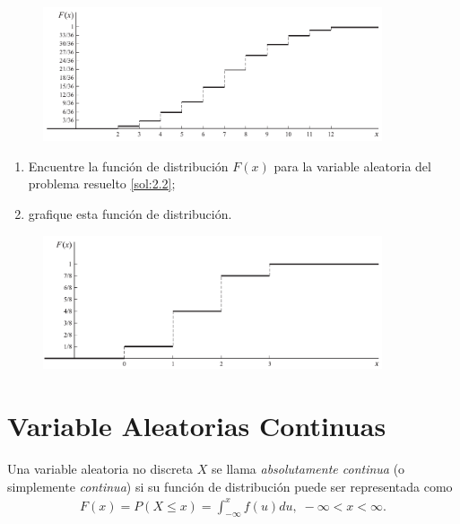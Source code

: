 \begin{figure}
 \centering
 \includegraphics[width=10cm,keepaspectratio=true]{./pe/pands0206.png}
\end{figure}




 \begin{ejemplo}
  \label{sol:2.4}
  \begin{enumerate}
   \item Encuentre la función de distribución $F(x)$ para la variable aleatoria del problema resuelto \ref{sol:2.2};
   \item grafique esta función de distribución.
  \end{enumerate}

 \end{ejemplo}



 \begin{figure}
 \centering
 \includegraphics[width=10cm,keepaspectratio=true]{./pe/pands0207.png}
\end{figure}


\chapter{Variable Aleatorias Continuas}

	Una variable aleatoria no discreta $X$ se llama \emph{absolutamente continua} (o simplemente \emph{continua}) si su función de distribución puede ser representada como
	\begin{align}
		 \label{2.7}
		 F(x)=P(X \leq x)=\int_{-\infty}^{x} f(u)du, \; -\infty < x <\infty.
	\end{align}



